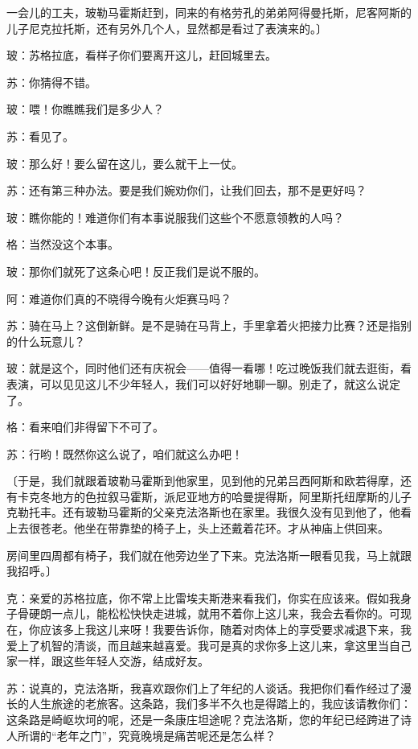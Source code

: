 \documentclass[12pt,oneside]{book}
\begin{document}
一会儿的工夫，玻勒马霍斯赶到，同来的有格劳孔的弟弟阿得曼托斯，尼客阿斯的儿子尼克拉托斯，还有另外几个人，显然都是看过了表演来的。〕

玻：苏格拉底，看样子你们要离开这儿，赶回城里去。

苏：你猜得不错。

玻：喂！你瞧瞧我们是多少人？

苏：看见了。

玻：那么好！要么留在这儿，要么就干上一仗。

苏：还有第三种办法。要是我们婉劝你们，让我们回去，那不是更好吗？

玻：瞧你能的！难道你们有本事说服我们这些个不愿意领教的人吗？

格：当然没这个本事。

玻：那你们就死了这条心吧！反正我们是说不服的。

阿：难道你们真的不晓得今晚有火炬赛马吗？

苏：骑在马上？这倒新鲜。是不是骑在马背上，手里拿着火把接力比赛？还是指别的什么玩意儿？

玻：就是这个，同时他们还有庆祝会——值得一看哪！吃过晚饭我们就去逛街，看表演，可以见见这儿不少年轻人，我们可以好好地聊一聊。别走了，就这么说定了。

格：看来咱们非得留下不可了。

苏：行哟！既然你这么说了，咱们就这么办吧！

〔于是，我们就跟着玻勒马霍斯到他家里，见到他的兄弟吕西阿斯和欧若得摩，还有卡克冬地方的色拉叙马霍斯，派尼亚地方的哈曼提得斯，阿里斯托纽摩斯的儿子克勒托丰。还有玻勒马霍斯的父亲克法洛斯也在家里。我很久没有见到他了，他看上去很苍老。他坐在带靠垫的椅子上，头上还戴着花环。才从神庙上供回来。

房间里四周都有椅子，我们就在他旁边坐了下来。克法洛斯一眼看见我，马上就跟我招呼。〕

克：亲爱的苏格拉底，你不常上比雷埃夫斯港来看我们，你实在应该来。假如我身子骨硬朗一点儿，能松松快快走进城，就用不着你上这儿来，我会去看你的。可现在，你应该多上我这儿来呀！我要告诉你，随着对肉体上的享受要求减退下来，我爱上了机智的清谈，而且越来越喜爱。我可是真的求你多上这儿来，拿这里当自己家一样，跟这些年轻人交游，结成好友。

苏：说真的，克法洛斯，我喜欢跟你们上了年纪的人谈话。我把你们看作经过了漫长的人生旅途的老旅客。这条路，我们多半不久也是得踏上的，我应该请教你们：这条路是崎岖坎坷的呢，还是一条康庄坦途呢？克法洛斯，您的年纪已经跨进了诗人所谓的“老年之门”，究竟晚境是痛苦呢还是怎么样？
\end{document}
